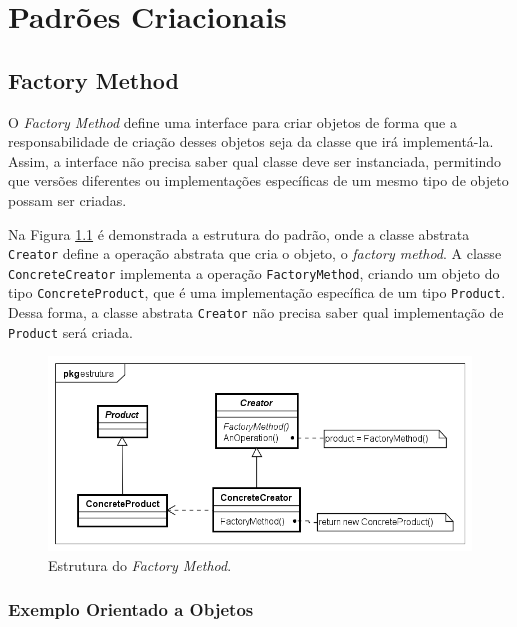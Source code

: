 \chapter{Padrões Criacionais}

\section{Factory Method}

O \textit{Factory Method} define uma interface para criar 
objetos de forma que a responsabilidade de criação 
desses objetos seja da classe que irá implementá-la. 
Assim, a interface não precisa saber qual 
classe deve ser instanciada, permitindo que versões 
diferentes ou implementações específicas de um mesmo 
tipo de objeto possam ser criadas.\cite{gamma:1995}

Na Figura \ref{fmethod_struct} é demonstrada 
a estrutura do padrão, onde a classe abstrata \texttt{Creator} 
define a operação abstrata que cria o objeto, 
o \textit{factory method}. A classe \texttt{ConcreteCreator} 
implementa a operação \texttt{FactoryMethod}, criando um objeto 
do tipo \texttt{ConcreteProduct}, que é uma implementação 
específica de um tipo \texttt{Product}. Dessa forma, a classe 
abstrata \texttt{Creator} não precisa saber qual implementação 
de \texttt{Product} será criada.

\begin{figure}[htb]
	\caption{\label{fmethod_struct}Estrutura do \textit{Factory Method}.}
	\begin{center}
	    \includegraphics[scale=0.5]{5_padroes-contexto-funcional/5.1_criacionais/5.1.1_factory-method/factorymethod_struct.png}
	\end{center}
\end{figure}


\subsection*{Exemplo Orientado a Objetos}

